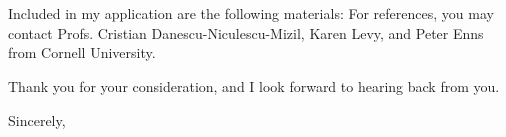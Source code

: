 \documentclass[12pt]{letter}
\begin{document}
\begin{letter}{
\department \\
\schoolnamelong \\
\schooladdress
}
Included in my application are the following materials: \materials
For references, you may contact Profs. Cristian Danescu-Niculescu-Mizil, Karen Levy, and Peter Enns from Cornell University.

Thank you for your consideration, and I look forward to hearing back from you.

\closing{Sincerely,}

\end{letter}
\end{document}

